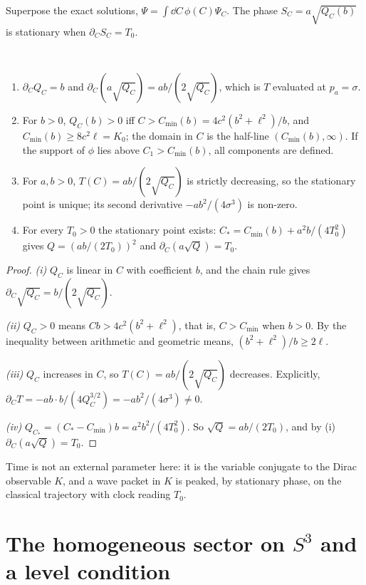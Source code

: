 Superpose the exact solutions, $\Psi=\int\dd C\,\phi(C)\Psi_C$. The phase $S_C=a\sqrt{Q_C(b)}$ is stationary when $\partial_CS_C=T_0$.

\begin{theorem}\label{thm:semiclock}\ver\
\begin{enumerate}[label=(\roman*)]
\item $\partial_CQ_C=b$ and $\partial_C(a\sqrt{Q_C})=ab/(2\sqrt{Q_C})$, which is $T$ evaluated at $p_a=\sigma$.
\item For $b>0$, $Q_C(b)>0$ iff $C>C_{\min}(b)=4c^2(b^2+\ell^2)/b$, and $C_{\min}(b)\ge8c^2\ell=K_0$; the domain in $C$ is the half-line $(C_{\min}(b),\infty)$. If the support of $\phi$ lies above $C_1>C_{\min}(b)$, all components are defined.
\item For $a,b>0$, $T(C)=ab/(2\sqrt{Q_C})$ is strictly decreasing, so the stationary point is unique; its second derivative $-ab^2/(4\sigma^3)$ is non-zero.
\item For every $T_0>0$ the stationary point exists: $C_*=C_{\min}(b)+a^2b/(4T_0^2)$ gives $Q=(ab/(2T_0))^2$ and $\partial_C(a\sqrt Q)=T_0$.
\end{enumerate}
\end{theorem}
\begin{proof}
\emph{(i)} $Q_C$ is linear in $C$ with coefficient $b$, and the chain rule gives $\partial_C\sqrt{Q_C}=b/(2\sqrt{Q_C})$.

\emph{(ii)} $Q_C>0$ means $Cb>4c^2(b^2+\ell^2)$, that is, $C>C_{\min}$ when $b>0$. By the inequality between arithmetic and geometric means, $(b^2+\ell^2)/b\ge2\ell$.

\emph{(iii)} $Q_C$ increases in $C$, so $T(C)=ab/(2\sqrt{Q_C})$ decreases. Explicitly, $\partial_CT=-ab\cdot b/(4Q_C^{3/2})=-ab^2/(4\sigma^3)\ne0$.

\emph{(iv)} $Q_{C_*}=(C_*-C_{\min})b=a^2b^2/(4T_0^2)$. So $\sqrt{Q}=ab/(2T_0)$, and by (i) $\partial_C(a\sqrt Q)=T_0$.
\end{proof}


Time is not an external parameter here: it is the variable conjugate to the Dirac observable $K$, and a wave packet in $K$ is peaked, by stationary phase, on the classical trajectory with clock reading $T_0$.

\section{The homogeneous sector on \texorpdfstring{$S^3$}{S3} and a level condition}


